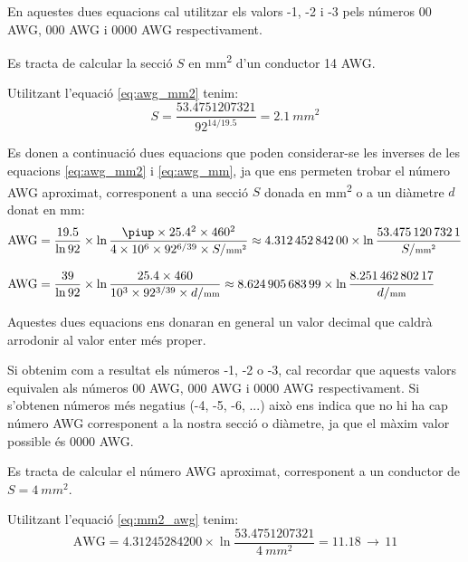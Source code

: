 En aquestes dues equacions cal utilitzar els valors -1, -2 i -3  pels números 00 AWG,
000 AWG i 0000 AWG respectivament.


\begin{exemple}
    Es tracta de calcular la secció $S$ en \si{mm^2} d'un conductor 14 AWG.

    Utilitzant l'equació \eqref{eq:awg_mm2} tenim:
    \[
        S = \dfrac{\num{53,4751207321}}{92^{14/\num{19,5}}} = \SI{2,1}{mm^2}
    \]
\end{exemple}


Es donen a continuació dues equacions que poden considerar-se les inverses de les equacions \eqref{eq:awg_mm2} i \eqref{eq:awg_mm}, ja que ens permeten trobar el número AWG aproximat, corresponent a una secció $S$ donada en \si{mm^2} o a un diàmetre $d$ donat en \si{mm}:
\begin{align}
   \text{AWG} &= \frac{\num{19,5}}{\ln 92} \times \ln \frac{\piup \times
   \num{25,4}^2 \times 460^2}{4 \times 10^6 \times 92^{6/39} \times S/{\scriptstyle\si{mm^2}}} \approx
   \num{4,31245284200} \times \ln \frac{\num{53,4751207321}}{S/{\scriptstyle\si{mm^2}}}\label{eq:mm2_awg} \\[2ex]
   \text{AWG} &= \frac{39}{\ln 92} \times \ln \frac{\num{25,4} \times 460}{10^3 \times 92^{3/39} \times d/{\scriptstyle\si{mm}}} \approx
   \num{8,62490568399} \times \ln \frac{\num{8,25146280217}}{d/{\scriptstyle\si{mm}}}\label{eq:mm_awg}
\end{align}

Aquestes dues equacions ens donaran en general un valor decimal que caldrà arrodonir al valor enter  més proper.

Si obtenim com a resultat els números -1, -2 o -3, cal recordar que aquests valors equivalen als números 00 AWG,
000 AWG i 0000 AWG respectivament. Si s'obtenen números més negatius (-4, -5, -6, ...) això ens indica que no hi ha cap número AWG corresponent a la nostra secció o diàmetre, ja que el màxim valor possible és 0000 AWG.


\begin{exemple}
    Es tracta de calcular el número AWG aproximat, corresponent a un conductor de $S=\SI{4}{mm^2}$.

    Utilitzant l'equació \eqref{eq:mm2_awg} tenim:
    \[
        \text{AWG} = \num{4,31245284200} \times \ln \dfrac{\num{53,4751207321}}{\SI{4}{mm^2}} =
        \num{11,18} \, \rightarrow \, 11
    \]
\end{exemple}

